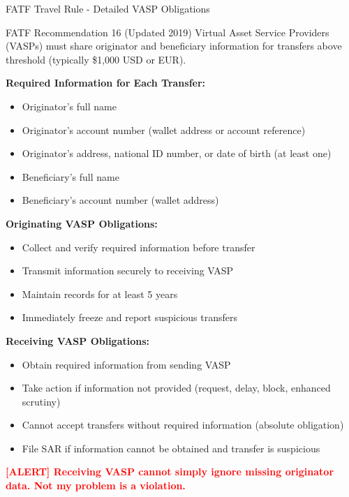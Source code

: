 \documentclass[11pt,a4paper]{beamer}
\newcommand{\redflag}[1]{\textcolor{red}{\textbf{[ALERT] #1}}}
\begin{document}
	\begin{frame}{FATF Travel Rule - Detailed VASP Obligations}
		\begin{block}{FATF Recommendation 16 (Updated 2019)}
			Virtual Asset Service Providers (VASPs) must share originator and beneficiary information for transfers above threshold (typically \$1,000 USD or EUR).
		\end{block}
		
		\textbf{Required Information for Each Transfer:}
		\begin{itemize}
			\item Originator's full name
			\item Originator's account number (wallet address or account reference)
			\item Originator's address, national ID number, or date of birth (at least one)
			\item Beneficiary's full name
			\item Beneficiary's account number (wallet address)
		\end{itemize}
		
		\textbf{Originating VASP Obligations:}
		\begin{itemize}
			\item Collect and verify required information before transfer
			\item Transmit information securely to receiving VASP
			\item Maintain records for at least 5 years
			\item Immediately freeze and report suspicious transfers
		\end{itemize}
		
		\textbf{Receiving VASP Obligations:}
		\begin{itemize}
			\item Obtain required information from sending VASP
			\item Take action if information not provided (request, delay, block, enhanced scrutiny)
			\item Cannot accept transfers without required information (absolute obligation)
			\item File SAR if information cannot be obtained and transfer is suspicious
		\end{itemize}
		
		\redflag{Receiving VASP cannot simply ignore missing originator data. Not my problem is a violation.}
	\end{frame}
	
\end{document}
